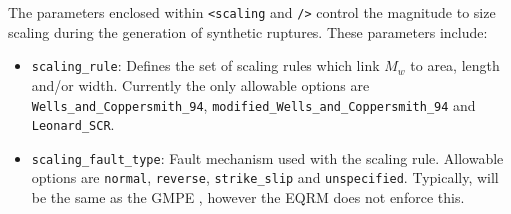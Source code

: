 The parameters enclosed within \texttt{<scaling} and \texttt{/>}
 control the magnitude to size scaling during the generation of
 synthetic ruptures. These parameters include:
\begin{itemize}

\item \texttt{scaling\_rule}: Defines the set of scaling rules which
  link $M_w$ to area, length and/or width. Currently the only
  allowable options are \texttt{Wells\_and\_Coppersmith\_94},
   \texttt{modified\_Wells\_and\_Coppersmith\_94} and 
  \texttt{Leonard\_SCR}.

\item \texttt{scaling\_fault\_type}: Fault mechanism used with the scaling rule.
Allowable options are \texttt{normal}, \texttt{reverse},
\texttt{strike\_slip} and \texttt{unspecified}. Typically,
 will be the same as the GMPE
, however the EQRM does not enforce this.  \\
\end{itemize}


